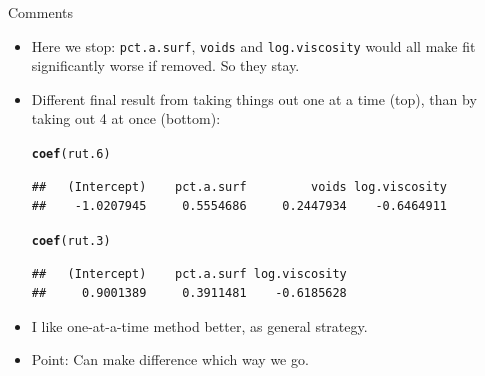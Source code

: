 \documentclass[unknownkeysallowed]{beamer}\usepackage[]{graphicx}\usepackage[]{color}
\makeatletter
\newcommand{\hlstd}[1]{\textcolor[rgb]{0.345,0.345,0.345}{#1}}%
\newcommand{\hlkwd}[1]{\textcolor[rgb]{0.737,0.353,0.396}{\textbf{#1}}}%
\newenvironment{kframe}{%
 \def\at@end@of@kframe{}%
 \ifinner\ifhmode%
  \def\at@end@of@kframe{\end{minipage}}%
  \begin{minipage}{\columnwidth}%
 \fi\fi%
 \def\FrameCommand##1{\hskip\@totalleftmargin \hskip-\fboxsep
 \colorbox{shadecolor}{##1}\hskip-\fboxsep
     \hskip-\linewidth \hskip-\@totalleftmargin \hskip\columnwidth}%
 \MakeFramed {\advance\hsize-\width
   \@totalleftmargin\z@ \linewidth\hsize
   \@setminipage}}%
 {\par\unskip\endMakeFramed%
 \at@end@of@kframe}
\newenvironment{knitrout}{}{} %
\makeatother
\begin{document}
\begin{frame}[fragile]{Comments}

  \begin{itemize}
  \item Here we stop: \texttt{pct.a.surf}, \texttt{voids} and
    \texttt{log.viscosity} would all make fit significantly worse if
    removed. So they stay.
  \item Different final result from taking things out one at a time (top),
    than by taking out 4 at once (bottom):
    \begin{small}
\begin{knitrout}
\color{fgcolor}\begin{kframe}
\begin{alltt}
\hlkwd{coef}\hlstd{(rut.6)}
\end{alltt}
\begin{verbatim}
##   (Intercept)    pct.a.surf         voids log.viscosity 
##    -1.0207945     0.5554686     0.2447934    -0.6464911
\end{verbatim}
\begin{alltt}
\hlkwd{coef}\hlstd{(rut.3)}
\end{alltt}
\begin{verbatim}
##   (Intercept)    pct.a.surf log.viscosity 
##     0.9001389     0.3911481    -0.6185628
\end{verbatim}
\end{kframe}
\end{knitrout}
    \end{small}

\item I like one-at-a-time method better, as general strategy.
\item Point: Can make difference which way we go.
  \end{itemize}
  
\end{frame}
\end{document}
